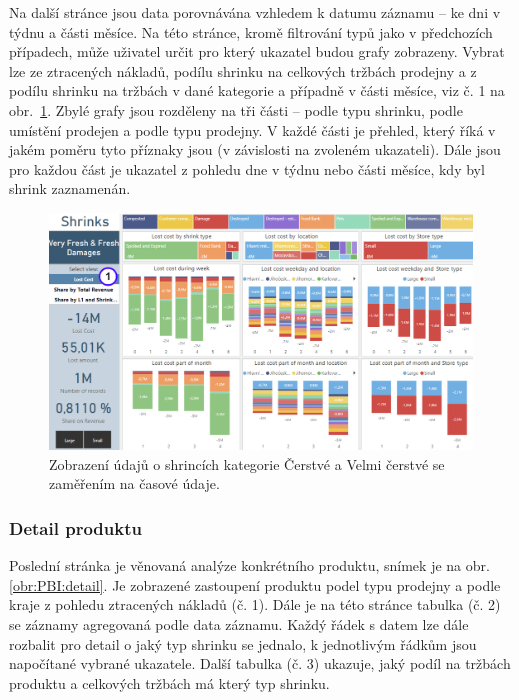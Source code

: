 Na další stránce jsou data porovnávána vzhledem k datumu záznamu -- ke dni v týdnu a části měsíce. Na této stránce, kromě filtrování typů jako v předchozích případech, může uživatel určit pro který ukazatel budou grafy zobrazeny. Vybrat lze ze ztracených nákladů, podílu shrinku na celkových tržbách prodejny a z podílu shrinku na tržbách v dané kategorie a případně v části měsíce, viz č. 1 na obr.~\ref*{obr:PBI:timeSFF}. Zbylé grafy jsou rozděleny na tři části -- podle typu shrinku, podle umístění prodejen a podle typu prodejny. V každé části je přehled, který říká v jakém poměru tyto příznaky jsou (v závislosti na zvoleném ukazateli). Dále jsou pro každou část je ukazatel z pohledu dne v týdnu nebo části měsíce, kdy byl shrink zaznamenán. 

\begin{figure}[h!]
    \centering
    \captionsetup{justification=centering}
    \includegraphics[width=\textwidth]{obrazky/PBI/timeSFF.png}
    \caption{Zobrazení údajů o shrincích kategorie Čerstvé a Velmi čerstvé se zaměřením na časové údaje.}
    \label{obr:PBI:timeSFF}
\end{figure}

\subsubsection*{Detail produktu}

Poslední stránka je věnovaná analýze konkrétního produktu, snímek je na obr. \ref*{obr:PBI:detail}. Je zobrazené zastoupení produktu podel typu prodejny a podle kraje z pohledu ztracených nákladů (č. 1). Dále je na této stránce tabulka (č. 2) se záznamy agregovaná podle data záznamu. Každý řádek s datem lze dále rozbalit pro detail o jaký typ shrinku se jednalo, k jednotlivým řádkům jsou napočítané vybrané ukazatele. Další tabulka (č. 3) ukazuje, jaký podíl na tržbách produktu a celkových tržbách má který typ shrinku. 

